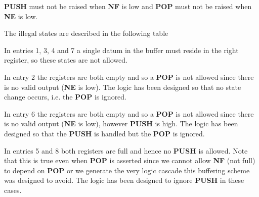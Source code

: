         {\bf PUSH} must not be raised when
        {\bf NF} is low and {\bf POP} must not be raised when
        {\bf NE} is low.

        The illegal states are described in the following table


        In entries 1, 3, 4 and 7 a single datum in the buffer must
        reside in the right register, so these states are not
        allowed.

        In entry 2 the registers are both empty and so a {\bf POP}
        is not allowed since there is no valid output ({\bf NE} is
        low). The logic has been designed so that no state change
        occurs, i.e. the {\bf POP} is ignored.

        In entry 6 the registers are both empty and so a {\bf POP}
        is not allowed since there is no valid output ({\bf NE} is
        low), however {\bf PUSH} is high. The logic has been designed
        so that the {\bf PUSH} is handled but the {\bf POP} is
        ignored.

        In entries 5 and 8 both registers are full and hence no {\bf
        PUSH} is allowed. Note that this is true even when {\bf POP}
        is asserted since we cannot allow {\bf NF} (not full) to
        depend on {\bf POP} or we generate the very logic cascade
        this buffering scheme was designed to avoid. The logic has
        been designed to ignore {\bf PUSH} in these cases.

